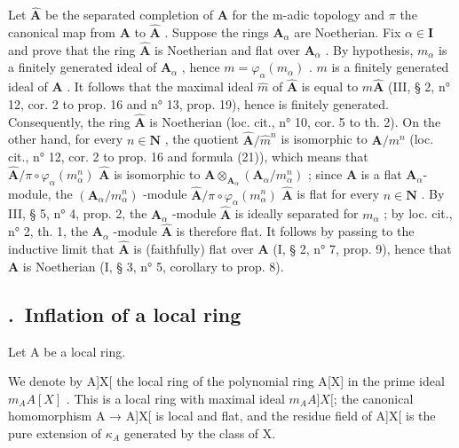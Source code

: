 \begin{enumerate}
  Let \(\hat{\mathbf{A}}\) be the separated completion of \(\mathbf{A}\) for the m-adic topology and \(\pi\) the canonical map from \(\mathbf{A}\) to \(\hat{\mathbf{A}}\) . Suppose the rings \(\mathbf{A}_{\alpha}\) are Noetherian. Fix \(\alpha \in \mathbf{I}\) and prove that the ring \(\hat{\mathbf{A}}\) is Noetherian and flat over \(\mathbf{A}_{\alpha}\) . By hypothesis, \(m_{\alpha}\) is a finitely generated ideal of \(\mathbf{A}_{\alpha}\) , hence \(m = \varphi_{\alpha}(m_{\alpha})\) . \(m\) is a finitely generated ideal of \(\mathbf{A}\) . It follows that the maximal ideal \(\hat{m}\) of \(\hat{\mathbf{A}}\) is equal to \(m\hat{\mathbf{A}}\) (III, § 2, n° 12, cor. 2 to prop. 16 and n° 13, prop. 19), hence is finitely generated. Consequently, the ring \(\hat{\mathbf{A}}\) is Noetherian (loc. cit., n° 10, cor. 5 to th. 2). On the other hand, for every \(n \in \mathbf{N}\) , the quotient \(\hat{\mathbf{A}}/\hat{m}^{n}\) is isomorphic to \(\mathbf{A}/m^{n}\) (loc. cit., n° 12, cor. 2 to prop. 16 and formula (21)), which means that \(\hat{\mathbf{A}}/\pi \circ \varphi_{\alpha}(m_{\alpha}^{n})\) \(\hat{\mathbf{A}}\) is isomorphic to \(\mathbf{A} \otimes_{\mathbf{A}_{\alpha}} (\mathbf{A}_{\alpha}/m_{\alpha}^{n})\) ; since \(\mathbf{A}\) is a flat \(\mathbf{A}_{\alpha}\)-module, the \((\mathbf{A}_{\alpha}/m_{\alpha}^{n})\) -module \(\hat{\mathbf{A}}/\pi \circ \varphi_{\alpha}(m_{\alpha}^{n})\) \(\hat{\mathbf{A}}\) is flat for every \(n \in \mathbf{N}\) . By III, § 5, n° 4, prop. 2, the \(\mathbf{A}_{\alpha}\) -module \(\hat{\mathbf{A}}\) is ideally separated for \(m_{\alpha}\) ; by loc. cit., n° 2, th. 1, the \(\mathbf{A}_{\alpha}\) -module \(\hat{\mathbf{A}}\) is therefore flat. It follows by passing to the inductive limit that \(\hat{\mathbf{A}}\) is (faithfully) flat over \(\mathbf{A}\) (I, § 2, n° 7, prop. 9), hence that \(\mathbf{A}\) is Noetherian (I, § 3, n° 5, corollary to prop. 8).
\end{enumerate}

\subsection*{\theappendixitem.\ Inflation of a local ring}
{}

Let A be a local ring.

We denote by A{]}X{[} the local ring of the polynomial ring A{[}X{]} in the prime ideal \(m_{A}A[X]\) . This is a local ring with maximal ideal \(m_{A}A{]}X{[}\); the canonical homomorphism A → A{]}X{[} is local and flat, and the residue field of A{]}X{[} is the pure extension of \(\kappa_{A}\) generated by the class of X.


